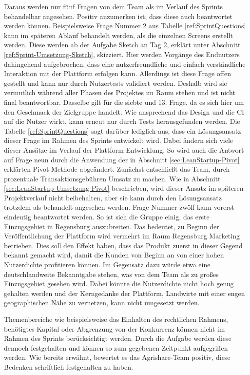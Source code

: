 Daraus werden nur fünf Fragen von dem Team als im Verlauf des Sprints behandelbar angesehen. Positiv anzumerken ist, dass diese auch beantwortet werden können. Beispielsweise Frage Nummer 2 aus Tabelle \ref{ref:SprintQuestions} kann im späteren Ablauf behandelt werden, als die einzelnen Screens erstellt werden. Diese werden ab der Aufgabe Sketch an Tag 2, erklärt unter Abschnitt \ref{ref:Sprint-Umsetzung-Sketch}, skizziert. Hier werden Vorgänge des Endnutzers dahingehend aufgebrochen, dass eine nutzerfreundliche und einfach verständliche Interaktion mit der Plattform erfolgen kann. Allerdings ist diese Frage offen gestellt und kann nur durch Nutzertests validiert werden. Deshalb wird sie vermutlich während aller Phasen des Projektes im Raum stehen und ist nicht final beantwortbar. Dasselbe gilt für die siebte und 13. Frage, da es sich hier um den Geschmack der Zielgruppe handelt. Wie ansprechend das Design und die \ac{CI} auf die Nutzer wirkt, kann erneut nur durch Tests herausgefunden werden. Die Tabelle \ref{ref:SprintQuestions} sagt darüber lediglich aus, dass ein Lösungsansatz dieser Frage im Rahmen des Sprints entwickelt wird. Dabei ändern sich viele dieser Ansätze im Verlauf der Plattform-Entwicklung. So wird auch die Antwort auf Frage neun durch die Anwendung der in Abschnitt \ref{sec:LeanStartup-Pivot} erklärten Pivot-Methode abgeändert. Zunächst entschließt das Team, durch prozentuale Transaktionsgebühren Umsatz zu machen. Wie in Abschnitt \ref{sec:LeanStartup-Umsetzung-Pivot} beschrieben, wird dieser Ansatz im späteren Projektverlauf nicht beibehalten, aber sie kann durch den Lösungsansatz trotzdem als behandelt angesehen werden. Frage Nummer zwölf kann vorerst eindeutig beantwortet werden. So ist sich die Gruppe einig, das erste Einzugsgebiet in Regensburg auszubreiten. Das bedeutet, zu Beginn der Veröffentlichung der Plattform wird vermehrt im Raum Regensburg Marketing betrieben. Dies soll den Effekt haben, dass das Produkt zuerst in dieser Gegend bekannt gemacht wird, damit die Kunden von Beginn an von einer hohen Nutzerdichte profitieren können. Im Gegensatz dazu würde etwa eine deutschlandweite Bekanntgabe stehen, was von dem Team als zu großes Einzugsgebiet gesehen wird. Dabei könnte die Nutzerdichte nicht hoch genug gehalten werden und der Kerngedanke der Plattform, Landwirte mit einer engen geographischen Nähe zu vernetzen, kann nicht umgesetzt werden. 

Themenbereiche wie beispielsweise das Einhalten des rechtlichen Rahmens, benötigtes Kapital oder Abgrenzung von der Konkurrenz können nicht im Rahmen des Sprints berücksichtigt werden. Durch die Aufgabe werden diese dennoch festgehalten und können so zum gegebenen Zeitpunkt aufgegriffen werden. Wie bereits erwähnt, bewertet es das Agrishare-Team positiv, diese Bedenken schriftlich festgehalten zu haben.

